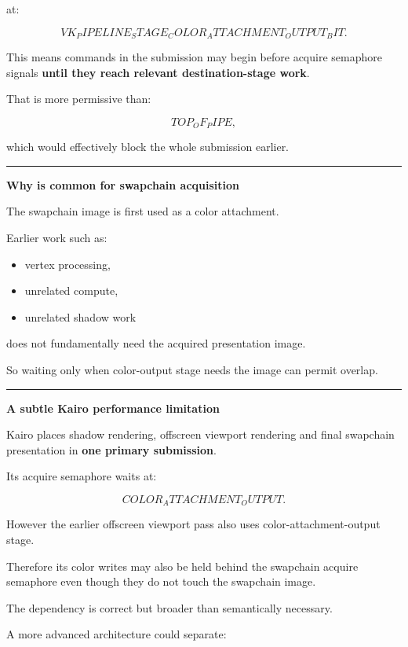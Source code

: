 at:

\[
VK_PIPELINE_STAGE_COLOR_ATTACHMENT_OUTPUT_BIT.
\]

This means commands in the submission may begin before acquire semaphore signals \textbf{until they reach relevant destination-stage work}.

That is more permissive than:

\[
TOP_OF_PIPE,
\]

which would effectively block the whole submission earlier.

\begin{center}\rule{0.5\linewidth}{0.5pt}\end{center}

\textbf{Why  is common for swapchain acquisition}

The swapchain image is first used as a color attachment.

Earlier work such as:

\begin{itemize}
\tightlist
\item
  vertex processing,
\item
  unrelated compute,
\item
  unrelated shadow work
\end{itemize}

does not fundamentally need the acquired presentation image.

So waiting only when color-output stage needs the image can permit overlap.

\begin{center}\rule{0.5\linewidth}{0.5pt}\end{center}

\textbf{A subtle Kairo performance limitation}

Kairo places shadow rendering, offscreen viewport rendering and final swapchain presentation in \textbf{one primary submission}.

Its acquire semaphore waits at:

\[
COLOR_ATTACHMENT_OUTPUT.
\]

However the earlier offscreen viewport pass also uses color-attachment-output stage.

Therefore its color writes may also be held behind the swapchain acquire semaphore even though they do not touch the swapchain image.

The dependency is correct but broader than semantically necessary.

A more advanced architecture could separate:

